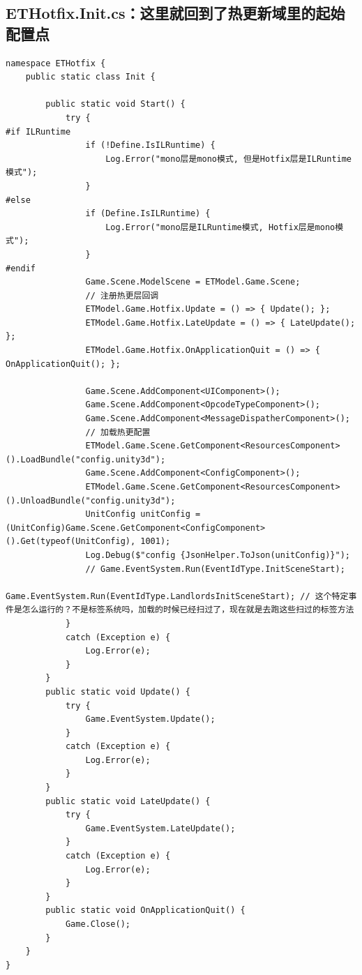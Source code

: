 \documentclass[9pt, b5paper]{article}
\begin{document}
\subsection{ETHotfix.Init.cs：这里就回到了热更新域里的起始配置点}
\label{sec-1-3}
\begin{verbatim}
namespace ETHotfix {
    public static class Init {

        public static void Start() {
            try {
#if ILRuntime
                if (!Define.IsILRuntime) {
                    Log.Error("mono层是mono模式, 但是Hotfix层是ILRuntime模式");
                }
#else
                if (Define.IsILRuntime) {
                    Log.Error("mono层是ILRuntime模式, Hotfix层是mono模式");
                }
#endif
                Game.Scene.ModelScene = ETModel.Game.Scene;
                // 注册热更层回调
                ETModel.Game.Hotfix.Update = () => { Update(); };
                ETModel.Game.Hotfix.LateUpdate = () => { LateUpdate(); };
                ETModel.Game.Hotfix.OnApplicationQuit = () => { OnApplicationQuit(); };
                
                Game.Scene.AddComponent<UIComponent>();
                Game.Scene.AddComponent<OpcodeTypeComponent>();
                Game.Scene.AddComponent<MessageDispatherComponent>();
                // 加载热更配置
                ETModel.Game.Scene.GetComponent<ResourcesComponent>().LoadBundle("config.unity3d");
                Game.Scene.AddComponent<ConfigComponent>();
                ETModel.Game.Scene.GetComponent<ResourcesComponent>().UnloadBundle("config.unity3d");
                UnitConfig unitConfig = (UnitConfig)Game.Scene.GetComponent<ConfigComponent>().Get(typeof(UnitConfig), 1001);
                Log.Debug($"config {JsonHelper.ToJson(unitConfig)}");
                // Game.EventSystem.Run(EventIdType.InitSceneStart);
                Game.EventSystem.Run(EventIdType.LandlordsInitSceneStart); // 这个特定事件是怎么运行的？不是标签系统吗，加载的时候已经扫过了，现在就是去跑这些扫过的标签方法
            }
            catch (Exception e) { 
                Log.Error(e);
            }
        }
        public static void Update() {
            try {
                Game.EventSystem.Update();
            }
            catch (Exception e) {
                Log.Error(e);
            }
        }
        public static void LateUpdate() {
            try {
                Game.EventSystem.LateUpdate();
            }
            catch (Exception e) {
                Log.Error(e);
            }
        }
        public static void OnApplicationQuit() {
            Game.Close();
        }
    }
}
\end{verbatim}
\end{document}
